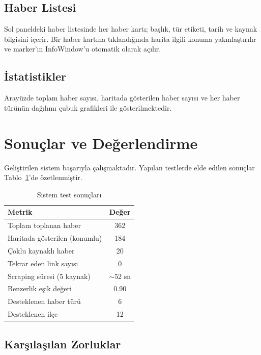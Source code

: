 \documentclass[conference]{IEEEtran}
\begin{document}
\subsection{Haber Listesi}

Sol paneldeki haber listesinde her haber kartı; başlık, tür etiketi, tarih ve kaynak bilgisini içerir. Bir haber kartına tıklandığında harita ilgili konuma yakınlaştırılır ve marker'ın InfoWindow'u otomatik olarak açılır.

\subsection{İstatistikler}

Arayüzde toplam haber sayısı, haritada gösterilen haber sayısı ve her haber türünün dağılımı çubuk grafikleri ile gösterilmektedir.

\section{Sonuçlar ve Değerlendirme}

Geliştirilen sistem başarıyla çalışmaktadır. Yapılan testlerde elde edilen sonuçlar Tablo~\ref{tab:sonuclar}'de özetlenmiştir.

\begin{table}[H]
    \centering
    \caption{Sistem test sonuçları}
    \label{tab:sonuclar}
    \begin{tabular}{|l|c|}
        \hline
        \textbf{Metrik} & \textbf{Değer} \\
        \hline
        Toplam toplanan haber & 362 \\
        Haritada gösterilen (konumlu) & 184 \\
        Çoklu kaynaklı haber & 20 \\
        Tekrar eden link sayısı & 0 \\
        Scraping süresi (5 kaynak) & $\sim$52 sn \\
        Benzerlik eşik değeri & 0.90 \\
        Desteklenen haber türü & 6 \\
        Desteklenen ilçe & 12 \\
        \hline
    \end{tabular}
\end{table}

\subsection{Karşılaşılan Zorluklar}
\end{document}
